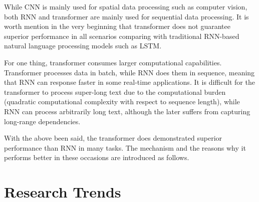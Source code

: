 While CNN is mainly used for spatial data processing such as computer vision, both RNN and transformer are mainly used for sequential data processing. It is worth mention in the very beginning that transformer does not guarantee superior performance in all scenarios comparing with traditional RNN-based natural language processing models such as LSTM.

For one thing, transformer consumes larger computational capabilities. Transformer processes data in batch, while RNN does them in sequence, meaning that RNN can response faster in some real-time applications. It is difficult for the transformer to process super-long text due to the computational burden (quadratic computational complexity with respect to sequence length), while RNN can process arbitrarily long text, although the later suffers from capturing long-range dependencies.

With the above been said, the transformer does demonstrated superior performance than RNN in many tasks. The mechanism and the reasons why it performs better in these occasions are introduced as follows.

\section{Research Trends} 